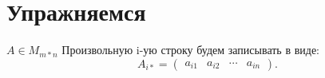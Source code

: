 %
%
%
%
%
%
%
%
%
%

\section{Упражняемся}
$A \in M_{m*n}$
 Произвольную i-ую строку будем записывать в виде:
 \[
     A_{i*} = \begin{pmatrix} a_{i1} & a_{i2} & \cdots & a_{in}\end{pmatrix}
 .\] 

